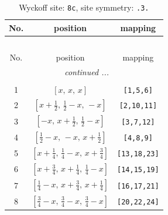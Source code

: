 \documentclass[fleqn,8pt]{jsarticle}
\begin{document}
\renewcommand{\arraystretch}{1.2}
\begin{longtable}{ccc}
\caption{Wyckoff site: {\tt 8c}, site symmetry: {\tt .3.}}
 \\
 \hline \hline
No. & position & mapping \\ \hline \endfirsthead

\multicolumn{2}{l}{\tablename\ \thetable{}} \\
 \hline \hline
No. & position & mapping \\ \hline \endhead

 \hline \hline
\multicolumn{2}{r}{\footnotesize\it continued ...} \\ \endfoot

 \hline \hline
\multicolumn{2}{r}{} \\ \endlastfoot

1 & $\left[ x,\, x,\, x \right]$ & {\tt [1,5,6]} \\ \hline
2 & $\left[ x + \frac{1}{2},\, \frac{1}{2} - x,\, - x \right]$ & {\tt [2,10,11]} \\ \hline
3 & $\left[ - x,\, x + \frac{1}{2},\, \frac{1}{2} - x \right]$ & {\tt [3,7,12]} \\ \hline
4 & $\left[ \frac{1}{2} - x,\, - x,\, x + \frac{1}{2} \right]$ & {\tt [4,8,9]} \\ \hline
5 & $\left[ x + \frac{1}{4},\, \frac{1}{4} - x,\, x + \frac{3}{4} \right]$ & {\tt [13,18,23]} \\ \hline
6 & $\left[ x + \frac{3}{4},\, x + \frac{1}{4},\, \frac{1}{4} - x \right]$ & {\tt [14,15,19]} \\ \hline
7 & $\left[ \frac{1}{4} - x,\, x + \frac{3}{4},\, x + \frac{1}{4} \right]$ & {\tt [16,17,21]} \\ \hline
8 & $\left[ \frac{3}{4} - x,\, \frac{3}{4} - x,\, \frac{3}{4} - x \right]$ & {\tt [20,22,24]} \\
\end{longtable}
\renewcommand{\arraystretch}{1.2}
\end{document}
